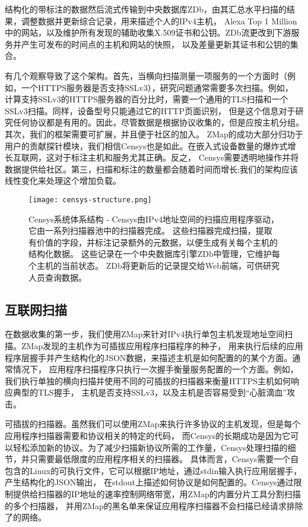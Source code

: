结构化的带标注的数据然后流式传输到中央数据库ZDb，由其汇总水平扫描的结果，调整数据并更新综合记录，用来描述个人的IPv4主机，
Alexa Top 1 Million中的网站，以及维护所有发现的辅助收集X.509证书和公钥。ZDb流更改到下游服务并产生可发布的时间点的主机和网站的快照，
以及差量更新其证书和公钥的集合。

有几个观察导致了这个架构。首先，当横向扫描测量一项服务的一个方面时（例如，一个HTTPS服务器是否支持SSLv3），研究问题通常需要多次扫描。例如，
计算支持SSLv3的HTTPS服务器的百分比时，需要一个通用的TLS扫描和一个SSLv3扫描。同样，设备型号只能通过它的HTTP页面识别，
但是这个信息对于研究任何协议都是有用的。因此，尽管数据是根据协议收集的，但是应按主机分组。其次，我们的框架需要可扩展，并且便于社区的加入。
ZMap的成功大部分归功于用户的贡献探针模块，我们相信Censys也是如此。在嵌入式设备数量的爆炸式增长互联网，这对于标注主机和服务尤其正确。反之，
Censys需要透明地操作并将数据提供给社区。第三，扫描和标注的数量都会随着时间而增长;我们的架构应该线性变化来处理这个增加负载。

\begin{figure}[H]
  \centering
  \texttt{[image: censys-structure.png]}
  \caption{{\heiti Censys系统体系结构} - Censys由IPv4地址空间的扫描应用程序驱动，它由一系列扫描器池中的扫描器完成。 
  这些扫描器完成扫描，提取有价值的字段，并标注记录额外的元数据，以便生成有关每个主机的结构化数据。 
  这些记录在一个中央数据库引擎ZDb中管理，它维护每个主机的当前状态。 ZDb将更新后的记录提交给Web前端，可供研究人员查询数据。}
  \label{fig:censys-structure}
\end{figure}

\subsection{互联网扫描}

在数据收集的第一步，我们使用ZMap来针对IPv4执行单包主机发现地址空间扫描。ZMap发现的主机作为可插拔应用程序扫描程序的种子，
用来执行后续的应用程序层握手并产生结构化的JSON数据，来描述主机是如何配置的的某个方面。通常情况下，
应用程序扫描程序只执行一次握手衡量服务配置的一个方面。例如，我们执行单独的横向扫描并使用不同的可插拔的扫描器来衡量HTTPS主机如何响应典型的TLS握手，
主机是否支持SSLv3，以及主机是否容易受到“心脏滴血”攻击。

{\heiti 可插拔的扫描器。}虽然我们可以使用ZMap来执行许多协议的主机发现，但是每个应用程序扫描器需要和协议相关的特定的代码，
而Censys的长期成功是因为它可以轻松添加新的协议。为了减少扫描新协议所需的工作量，Censys处理扫描的细节，并只需要最低限度的应用程序相关的扫描器。
具体而言，Censys需要一个自包含的Linux的可执行文件，它可以根据IP地址，通过stdin输入执行应用层握手，产生结构化的JSON输出，
在stdout上描述如何协议是如何配置的。Censys通过限制提供给扫描器的IP地址的速率控制网络带宽，用ZMap的内置分片工具分割扫描的多个扫描器，
并用ZMap的黑名单来保证应用程序扫描器不会扫描已经请求排除了的网络。

